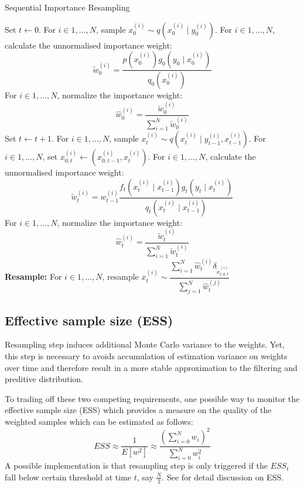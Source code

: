 \begin{algorithm}
\caption{Sequential Importance Resampling}\label{algo:sir}
\begin{algorithmic}[1]
\State Set $t \gets 0$.
\State For $i \in 1, \ldots, N$, sample $x^{(i)}_0 \sim q(x^{(i)}_0 \mid y^{(i)}_0)$.
\State For $i \in 1, \ldots, N$, calculate the unnormalised importance weight:
\begin{equation*}
 \tilde{w}^{(i)}_0 = \dfrac{p(x_0^{(i)})g_0(y_0 \mid x^{(i)}_0)}{q_0(x^{(i)}_0)}
\end{equation*}
\State For $i \in 1, \ldots, N$, normalize the importance weight:
\begin{equation*}
\hat{w}^{(i)}_0 = \dfrac{\tilde{w}^{(i)}_0}{\sum^N_{i=1} \tilde{w}^{(i)}_0}
\end{equation*}
\State Set $t \gets t + 1$.
\State For $i \in 1, \ldots, N$, sample $x^{(i)}_t \sim q(x^{(i)}_t \mid y^{(i)}_{t-1}, x^{(i)}_{t-1})$.
\State For $i \in 1, \ldots, N$, set $x^{(i)}_{0:t} \gets (x^{(i)}_{0:t-1}, x^{(i)}_t)$.
\State For $i \in 1, \ldots, N$, calculate the unnormalised importance weight:
\begin{equation*}
 \tilde{w}^{(i)}_t = w^{(i)}_{t-1} \dfrac{f_t(x^{(i)}_t \mid x^{(i)}_{t-1})g_t(y_t \mid x^{(i)}_t)}{q_t(x^{(i)}_t \mid x^{(i)}_{t-1})}
\end{equation*}
\State For $i \in 1, \ldots, N$, normalize the importance weight:
\begin{equation*}
\hat{w}^{(i)}_t = \dfrac{\tilde{w}^{(i)}_t}{\sum^N_{i=1} \tilde{w}^{(i)}_t}
\end{equation*}
\State \textbf{Resample:} For $i \in 1, \ldots, N$, resample $ x^{(i)}_t \sim \dfrac{\sum^N_{i=1}\hat{w}^{(i)}_t\delta_{\tilde{x}^{(i)}_{t,0:t}}}{\sum^N_{j=1} \hat{w}^{(j)}_t}$
\EndWhile
\EndFunction
\end{algorithmic}
\end{algorithm}

\subsection{Effective sample size (ESS)}
Resampling step induces additional Monte Carlo variance to the weights. Yet, this step is necessary to avoids accumulation of estimation variance on weights over time and therefore result in a more stable approximation to the filtering and preditive distribution.

To trading off these two competing requirements, one possible way to monitor the effective sample size (ESS) which provides a measure on the quality of the weighted samples which can be estimated as follows:
\begin{equation}
  ESS \approx \dfrac{1}{E[w^2]} \approx \dfrac{\left(\sum^N_{i=0} w_i \right)^2}{\sum^N_{i=0}w_i^2}
\end{equation}
A possible implementation is that resampling step is only triggered if the $ESS_t$ fall below certain threshold at time $t$, say $\frac{N}{2}$. See \cite{JAM10} for detail discussion on ESS.

